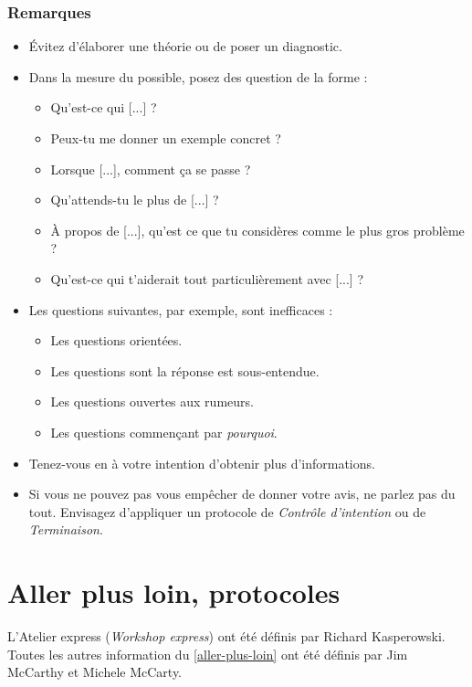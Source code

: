 \documentclass[11pt]{book}
\newcommand*{\numref}[1]{{\hyperref[{#1}]{\autoref*{#1}}}}
\begin{document}
\subsection{Remarques}
\begin{itemize}
	\item Évitez d'élaborer une théorie ou de poser un diagnostic.
	\item Dans la mesure du possible, posez des question de la forme :
	      \begin{itemize}
	      	\item \og{}Qu'est-ce qui [...] ?\fg{}
	      	\item \og{}Peux-tu me donner un exemple concret ?\fg{}
	      	\item \og{}Lorsque [...], comment ça se passe ?\fg{}
	      	\item \og{}Qu'attends-tu le plus de [...] ?\fg{}
	      	\item \og{}À propos de [...], qu'est ce que tu considères comme le plus gros problème ?\fg{}
	      	\item \og{}Qu'est-ce qui t'aiderait tout particulièrement avec [...] ?\fg{}
	      \end{itemize}
	\item Les questions suivantes, par exemple, sont inefficaces :
		  \begin{itemize}
		  	\item Les questions orientées.
		    \item Les questions sont la réponse est sous-entendue.
		    \item Les questions ouvertes aux rumeurs.
		    \item Les questions commençant par \emph{pourquoi}.
		  \end{itemize}
	\item Tenez-vous en à votre intention d'obtenir plus d'informations.
	\item Si vous ne pouvez pas vous empêcher de donner votre avis, ne parlez pas du tout. Envisagez d'appliquer un protocole de \emph{Contrôle d'intention}
	      ou de \emph{Terminaison}.
\end{itemize}

\chapter{Aller plus loin, protocoles} \label{aller-plus-loin}

L'Atelier express (\emph{Workshop express}) ont été définis par Richard Kasperowski. Toutes les autres information du \numref{aller-plus-loin} ont été 
définis par Jim McCarthy et Michele McCarty.
\end{document}
